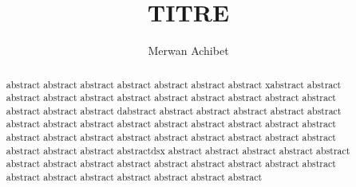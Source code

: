 \documentclass[10pt]{article}
\title{TITRE}
\author{Merwan Achibet}
\date{}
\begin{document}
\maketitle

\begin{abstract}
abstract abstract abstract abstract abstract abstract abstract
xabstract abstract abstract abstract abstract abstract abstract
abstract abstract abstract abstract abstract abstract abstract
dabstract abstract abstract abstract abstract abstract abstract
abstract abstract abstract abstract abstract abstract abstract
abstract abstract abstract abstract abstract abstract abstract
abstract abstract abstract abstract abstract abstract abstractdsx
abstract abstract abstract abstract abstract abstract abstract
abstract abstract abstract abstract abstract abstract abstract
abstract abstract abstract abstract abstract abstract abstract
\end{abstract}
\end{document}
